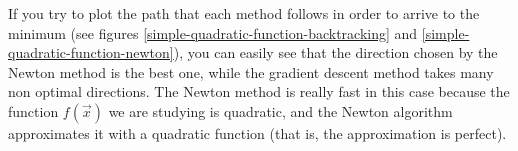         If you try to plot the path that each method follows in order to arrive to the minimum (see figures \ref{simple-quadratic-function-backtracking} and \ref{simple-quadratic-function-newton}), you can easily see that the direction chosen by the Newton method is the best one, while the gradient descent method takes many non optimal directions. The Newton method is really fast in this case because the function \(f(\vec{x})\) we are studying is quadratic, and the Newton algorithm approximates it with a quadratic function (that is, the approximation is perfect).